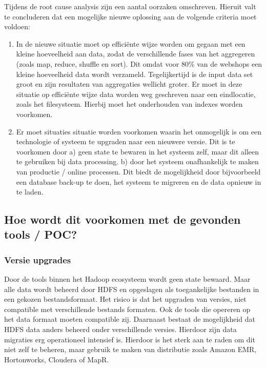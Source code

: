 Tijdens de root cause analysis zijn een aantal oorzaken omschreven. Hieruit valt te concluderen dat een mogelijke nieuwe oplossing aan de volgende criteria moet voldoen:

\begin{enumerate}[label=(\alph*)]

    \item In de nieuwe situatie moet op efficiënte wijze worden om gegaan met een kleine hoeveelheid aan data, zodat de verschillende fases van het aggregeren (zoals map, reduce, shuffle en sort). Dit omdat voor 80\% van de webshops een kleine hoeveelheid data wordt verzameld. Tegelijkertijd is de input data set groot en zijn resultaten van aggregaties wellicht groter. Er moet in deze situatie op efficiënte wijze data worden weg geschreven naar een eindlocatie,  zoals het filesysteem. Hierbij moet het onderhouden van indexes worden voorkomen.
    
    \item Er moet situaties situatie worden voorkomen waarin het onmogelijk is om een technologie of systeem te upgraden naar een nieuwere versie. Dit is te voorkomen door a) geen state te bewaren in het systeem zelf, maar dit alleen te gebruiken bij data processing. b) door het systeem onafhankelijk te maken van productie / online processen. Dit biedt de mogelijkheid door bijvoorbeeld een database back-up te doen, het systeem te migreren en de data opnieuw in te laden.
\end{enumerate}

\clearpage


\subsection{Hoe wordt dit voorkomen met de gevonden tools / POC?}
\label{subsec:deelvraag3_vergelijking}


\subsubsection{\textbf{Versie upgrades}}

Door de tools binnen het Hadoop ecosysteem wordt geen state bewaard. Maar alle data wordt beheerd door HDFS en opgeslagen als toegankelijke bestanden in een gekozen bestandsformaat. Het risico is dat het upgraden van versies, niet compatible met verschillende bestands formaten. Ook de tools die opereren op het data formaat moeten compatible zij. Daarnaast bestaat de mogelijkheid dat HDFS data anders beheerd onder verschillende versies. Hierdoor zijn data migraties erg operationeel intensief is. Hierdoor is het sterk aan te raden om dit niet zelf te beheren, maar gebruik te maken van distributie zoals Amazon EMR, Hortonworks, Cloudera of MapR.

